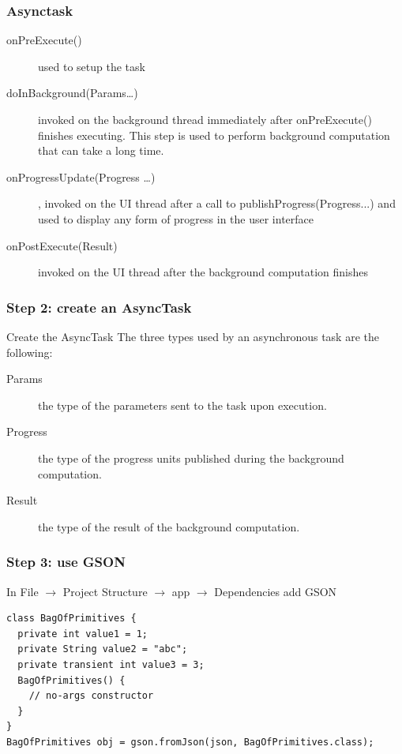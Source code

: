 \documentclass{beamer}
\begin{document}
\begin{frame}
	\frametitle{Asynctask}

\begin{description}
	\item [onPreExecute()]  used to setup the task
  \item [doInBackground(Params\dots)] invoked on the background thread immediately after onPreExecute() finishes executing. This step is used to perform background computation that can take a long time. 
    \item [onProgressUpdate(Progress \dots)], invoked on the UI thread after a call to publishProgress(Progress...) and used to display any form of progress in the user interface 
    \item [onPostExecute(Result)] invoked on the UI thread after the background computation finishes
\end{description}

\end{frame}

\begin{frame}
	\frametitle{Step 2: create an AsyncTask}
	Create the AsyncTask
	The three types used by an asynchronous task are the following:

\begin{description}
	\item [Params] the type of the parameters sent to the task upon execution.
  \item [Progress] the type of the progress units published during the background computation.
  \item [Result] the type of the result of the background computation.
\end{description}

\end{frame}

\begin{frame}
	\frametitle{Step 3: use GSON}
	In File $\rightarrow$ Project Structure $\rightarrow$ app $\rightarrow$ Dependencies add GSON 
\end{frame}

\begin{frame}[fragile]
	\begin{lstlisting}[style=java]
	class BagOfPrimitives {
  private int value1 = 1;
  private String value2 = "abc";
  private transient int value3 = 3;
  BagOfPrimitives() {
    // no-args constructor
  }
}
BagOfPrimitives obj = gson.fromJson(json, BagOfPrimitives.class);   
	
	\end{lstlisting}
\end{frame}
\end{document}

